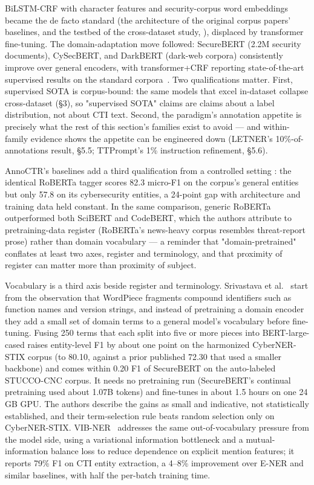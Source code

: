 \documentclass[11pt]{article}
\begin{document}
BiLSTM-CRF with character features and security-corpus word embeddings became the de facto standard (the architecture of the original corpus papers' baselines, and the testbed of the cross-dataset study, \citealp{jalocha2025label}), displaced by transformer fine-tuning. The domain-adaptation move followed: SecureBERT (2.2M security documents), CySecBERT, and DarkBERT (dark-web corpora) consistently improve over general encoders, with transformer+CRF reporting state-of-the-art supervised results on the standard corpora~\citep{echchammakhy2025cyberner}. Two qualifications matter. First, supervised SOTA is corpus-bound: the same models that excel in-dataset collapse cross-dataset (§3), so "supervised SOTA" claims are claims about a label distribution, not about CTI text. Second, the paradigm's annotation appetite is precisely what the rest of this section's families exist to avoid — and within-family evidence shows the appetite can be engineered down (LETNER's 10\%-of-annotations result, §5.5; TTPrompt's 1\% instruction refinement, §5.6).

AnnoCTR's baselines add a third qualification from a controlled setting \citep{lange2024annoctr}: the identical RoBERTa tagger scores 82.3 micro-F1 on the corpus's general entities but only 57.8 on its cybersecurity entities, a 24-point gap with architecture and training data held constant. In the same comparison, generic RoBERTa outperformed both SciBERT and CodeBERT, which the authors attribute to pretraining-data register (RoBERTa's news-heavy corpus resembles threat-report prose) rather than domain vocabulary — a reminder that "domain-pretrained" conflates at least two axes, register and terminology, and that proximity of register can matter more than proximity of subject.

Vocabulary is a third axis beside register and terminology. Srivastava et al.~\citep{srivastava2026lightweight} start from the observation that WordPiece fragments compound identifiers such as function names and version strings, and instead of pretraining a domain encoder they add a small set of domain terms to a general model's vocabulary before fine-tuning. Fusing 250 terms that each split into five or more pieces into BERT-large-cased raises entity-level F1 by about one point on the harmonized CyberNER-STIX corpus (to 80.10, against a prior published 72.30 that used a smaller backbone) and comes within 0.20 F1 of SecureBERT on the auto-labeled STUCCO-CNC corpus. It needs no pretraining run (SecureBERT's continual pretraining used about 1.07B tokens) and fine-tunes in about 1.5 hours on one 24 GB GPU. The authors describe the gains as small and indicative, not statistically established, and their term-selection rule beats random selection only on CyberNER-STIX. VIB-NER~\citep{wang2026vibner} addresses the same out-of-vocabulary pressure from the model side, using a variational information bottleneck and a mutual-information balance loss to reduce dependence on explicit mention features; it reports 79\% F1 on CTI entity extraction, a 4--8\% improvement over E-NER and similar baselines, with half the per-batch training time.
\end{document}
